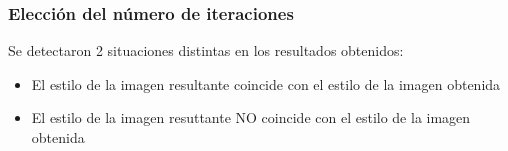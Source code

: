 \documentclass[10pt,center]{beamer}
\begin{document}
\begin{frame}
\begin{figure}
\begin{center}
\begin{tabularx}{\textwidth}{@{}cXX@{}}
      \end{tabularx}
      \end{center}

    \end{figure}
\end{frame}

\begin{frame}
  \frametitle{Elección del número de iteraciones}
  Se detectaron 2 situaciones distintas en los resultados obtenidos:
  \begin{itemize}
    \item El estilo de la imagen resultante coincide con el estilo de la imagen obtenida
    \item El estilo de la imagen resuttante NO coincide con el estilo de la imagen obtenida
  \end{itemize}

\end{frame}
\end{document}
